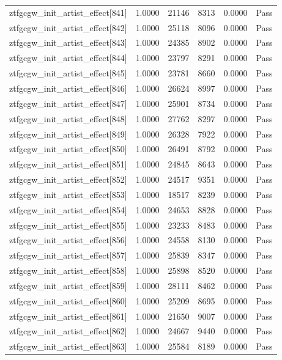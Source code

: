 \begin{table}[htbp]
\begin{tabular}{llrrll}
ztfgcgw\_init\_artist\_effect[841] & 1.0000 & 21146 & 8313 & 0.0000 & Pass \\
ztfgcgw\_init\_artist\_effect[842] & 1.0000 & 25118 & 8096 & 0.0000 & Pass \\
ztfgcgw\_init\_artist\_effect[843] & 1.0000 & 24385 & 8902 & 0.0000 & Pass \\
ztfgcgw\_init\_artist\_effect[844] & 1.0000 & 23797 & 8291 & 0.0000 & Pass \\
ztfgcgw\_init\_artist\_effect[845] & 1.0000 & 23781 & 8660 & 0.0000 & Pass \\
ztfgcgw\_init\_artist\_effect[846] & 1.0000 & 26624 & 8997 & 0.0000 & Pass \\
ztfgcgw\_init\_artist\_effect[847] & 1.0000 & 25901 & 8734 & 0.0000 & Pass \\
ztfgcgw\_init\_artist\_effect[848] & 1.0000 & 27762 & 8297 & 0.0000 & Pass \\
ztfgcgw\_init\_artist\_effect[849] & 1.0000 & 26328 & 7922 & 0.0000 & Pass \\
ztfgcgw\_init\_artist\_effect[850] & 1.0000 & 26491 & 8792 & 0.0000 & Pass \\
ztfgcgw\_init\_artist\_effect[851] & 1.0000 & 24845 & 8643 & 0.0000 & Pass \\
ztfgcgw\_init\_artist\_effect[852] & 1.0000 & 24517 & 9351 & 0.0000 & Pass \\
ztfgcgw\_init\_artist\_effect[853] & 1.0000 & 18517 & 8239 & 0.0000 & Pass \\
ztfgcgw\_init\_artist\_effect[854] & 1.0000 & 24653 & 8828 & 0.0000 & Pass \\
ztfgcgw\_init\_artist\_effect[855] & 1.0000 & 23233 & 8483 & 0.0000 & Pass \\
ztfgcgw\_init\_artist\_effect[856] & 1.0000 & 24558 & 8130 & 0.0000 & Pass \\
ztfgcgw\_init\_artist\_effect[857] & 1.0000 & 25839 & 8347 & 0.0000 & Pass \\
ztfgcgw\_init\_artist\_effect[858] & 1.0000 & 25898 & 8520 & 0.0000 & Pass \\
ztfgcgw\_init\_artist\_effect[859] & 1.0000 & 28111 & 8462 & 0.0000 & Pass \\
ztfgcgw\_init\_artist\_effect[860] & 1.0000 & 25209 & 8695 & 0.0000 & Pass \\
ztfgcgw\_init\_artist\_effect[861] & 1.0000 & 21650 & 9007 & 0.0000 & Pass \\
ztfgcgw\_init\_artist\_effect[862] & 1.0000 & 24667 & 9440 & 0.0000 & Pass \\
ztfgcgw\_init\_artist\_effect[863] & 1.0000 & 25584 & 8189 & 0.0000 & Pass \\

\end{tabular}
\end{table}
